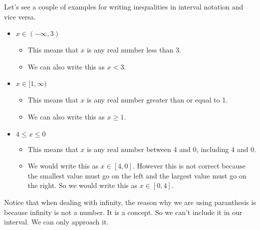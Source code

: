 Let's see a couple of examples for writing inequalities in interval notation and vice versa.

\begin{itemize}
    \item  $x \in (-\infty, 3)$
          \begin{itemize}
              \item This means that $x$ is any real number less than 3.
              \item We can also write this as $x < 3$.
          \end{itemize}
    \item $x \in [1, \infty)$
            \begin{itemize}
                \item This means that $x$ is any real number greater than or equal to 1.
                \item We can also write this as $x \geq 1$.
            \end{itemize}
    \item $4 \leq x \le 0$
            \begin{itemize}
                \item This means that $x$ is any real number between 4 and 0, including 4 and 0.
                \item We would write this as $x \in [4, 0]$. However this is not correct because the smallest value must go on the left and the largest value must go on the right. So we would write this as $x \in [0, 4]$.
            \end{itemize}
\end{itemize}

Notice that when dealing with infinity, the reason why we are using paranthesis is because infinity is not a number. It is a concept. So we can't include it in our interval. We can only approach it.
